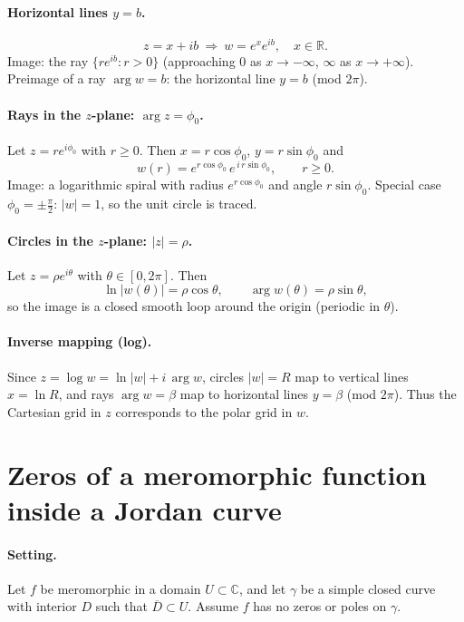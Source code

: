 \documentclass[12pt,a4paper]{article}
\newcommand{\C}{\mathbb{C}}
\newcommand{\R}{\mathbb{R}}
\begin{document}
\paragraph{Horizontal lines \(y=b\).}
\[
z=x+ib\ \Rightarrow\ w=e^{x}e^{ib},\quad x\in\R.
\]
Image: the ray \(\{re^{ib}:r>0\}\) (approaching \(0\) as \(x\to-\infty\), \(\infty\) as \(x\to+\infty\)).
Preimage of a ray \(\arg w=b\): the horizontal line \(y=b\) (mod \(2\pi\)).

\paragraph{Rays in the \(z\)-plane: \(\arg z=\phi_{0}\).}
Let \(z=r e^{i\phi_{0}}\) with \(r\ge0\). Then \(x=r\cos\phi_{0}\), \(y=r\sin\phi_{0}\) and
\[
w(r)=e^{r\cos\phi_{0}}\,e^{\,i\,r\sin\phi_{0}},\qquad r\ge0.
\]
Image: a logarithmic spiral with radius \(e^{r\cos\phi_{0}}\) and angle \(r\sin\phi_{0}\).
Special case \(\phi_{0}=\pm\frac{\pi}{2}\): \(|w|=1\), so the unit circle is traced.

\paragraph{Circles in the \(z\)-plane: \(|z|=\rho\).}
Let \(z=\rho e^{i\theta}\) with \(\theta\in[0,2\pi]\). Then
\[
\ln|w(\theta)|=\rho\cos\theta,\qquad \arg w(\theta)=\rho\sin\theta,
\]
so the image is a closed smooth loop around the origin (periodic in \(\theta\)).

\paragraph{Inverse mapping (log).}
Since \(z=\log w=\ln|w|+i\,\arg w\), circles \(|w|=R\) map to vertical lines \(x=\ln R\),
and rays \(\arg w=\beta\) map to horizontal lines \(y=\beta\) (mod \(2\pi\)).
Thus the Cartesian grid in \(z\) corresponds to the polar grid in \(w\).


\section*{Zeros of a meromorphic function inside a Jordan curve}

\paragraph{Setting.}
Let \(f\) be meromorphic in a domain \(U\subset\C\), and let \(\gamma\) be a simple
closed curve with interior \(D\) such that \(\overline{D}\subset U\).
Assume \(f\) has no zeros or poles on \(\gamma\).
\end{document}
